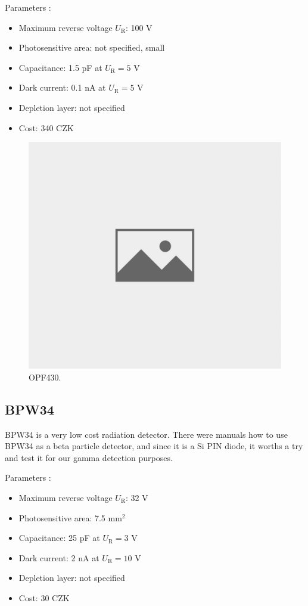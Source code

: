 Parameters \cite{datOPF430}:
\begin{itemize}
\item Maximum reverse voltage $U_\textrm{R}$: 100 V
\item Photosensitive area: not specified, small
\item Capacitance: 1.5  pF at $U_\textrm{R} = 5$ V
\item Dark current: 0.1 nA at $U_\textrm{R} = 5$ V
\item Depletion layer: not specified
\item Cost: 340 CZK
\end{itemize}

\begin{figure}[H]
 \centering
 \includegraphics[scale=0.35, angle = 0]{./pictures/NoPicture.jpg}
 \caption{OPF430.}
 \label{OPF430}
 
\end{figure}

\subsection{BPW34}
BPW34 is a very low cost radiation detector. There were manuals \cite{betaBPW} how to use BPW34 as a beta particle detector, and since it is a Si PIN diode, it worths a try and test it for our gamma detection purposes.



Parameters \cite{datBPW34}:
\begin{itemize}
\item Maximum reverse voltage $U_\textrm{R}$: 32 V
\item Photosensitive area: 7.5 mm$^2$
\item Capacitance: 25 pF at $U_\textrm{R} = 3$ V
\item Dark current: 2 nA at $U_\textrm{R} = 10$ V
\item Depletion layer: not specified
\item Cost: 30 CZK
\end{itemize}

